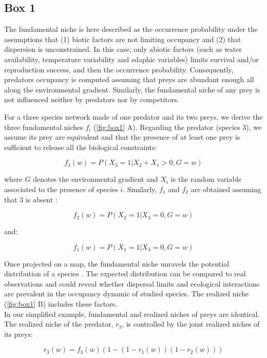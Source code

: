 \newpage

\subsection{Box 1}\label{box-1}

The fundamental niche is here described as the occurrence probability
under the assumptions that (1) biotic factors are not limiting occupancy
and (2) that dispersion is unconstrained. In this case, only abiotic
factors (such as water availability, temperature variability and edaphic
variables) limits survival and/or reproduction success, and then the
occurrence probability. Consequently, predators occupancy is computed
assuming that preys are abundant enough all along the environmental
gradient. Similarly, the fundamental niche of any prey is not influenced
neither by predators nor by competitors.

For a three species network made of one predator and its two preys, we
derive the three fundamental niches \(f_i\) (\ref{fig:box1} A).
Regarding the predator (species 3), we assume its prey are equivalent
and that the presence of at least one prey is sufficient to release all
the biological constraints:

\[f_3(w)=P(X_3=1|X_2+X_1>0, G=w)\]

where \(G\) denotes the environmental gradient and \(X_i\) is the random
variable associated to the presence of species \(i\). Similarly, \(f_1\)
and \(f_2\) are obtained assuming that 3 is absent :

\[f_2(w)=P(X_2=1|X_3=0, G=w)\]

and:

\[f_1(w)=P(X_1=1|X_3=0, G=w)\]

Once projected on a map, the fundamental niche unravels the potential
distribution of a species \citep{Kearney2004}. The expected distribution
can be compared to real observations and could reveal whether dispersal
limits and ecological interactions are prevalent in the occupancy
dynamic of studied species. The realized niche (\ref{fig:box1} B)
includes these factors.\\
In our simplified example, fundamental and realized niches of preys are
identical. The realized niche of the predator, \(r_3\), is controlled by
the joint realized niches of its preys:

\[r_3(w)=f_3(w)\left(1-(1-r_1(w))(1-r_2(w))\right)\]

